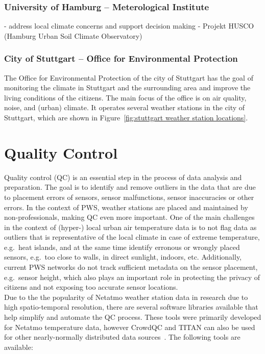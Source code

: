 \subsubsection{University of Hamburg – Meterological Institute}

- address local climate concerns and support decision making
- Projekt HUSCO (Hamburg Urban Soil Climate Observatory)

\subsubsection{City of Stuttgart – Office for Environmental Protection}

The Office for Environmental Protection of the city of Stuttgart has the goal of monitoring the climate in Stuttgart and the surrounding area and improve the living conditions of the citizens. The main focus of the office is on air quality, noise, and (urban) climate. It operates several weather stations in the city of Stuttgart, which are shown in Figure~\ref{fig:stuttgart weather station locations}.


\section{Quality Control}
\label{sec:quality control}

Quality control (QC) is an essential step in the process of data analysis and preparation. The goal is to identify and remove outliers in the data that are due to placement errors of sensors, sensor malfunctions, sensor inaccuracies or other errors. In the context of PWS, weather stations are placed and maintained by non-professionals, making QC even more important. One of the main challenges in the context of (hyper-) local urban air temperature data is to not flag data as outliers that is representative of the local climate in case of extreme temperature, e.g.\ heat islands, and at the same time identify erronous or wrongly placed sensors, e.g.\ too close to walls, in direct sunlight, indoors, etc. Additionally, current PWS networks do not track sufficient metadata on the sensor placement, e.g.\ sensor height, which also plays an important role in protecting the privacy of citizens and not exposing too accurate sensor locations.\\
Due to the the popularity of Netatmo weather station data in research due to high spatio-temporal resolution, there are several software libraries available that help simplify and automate the QC process. These tools were primarily developed for Netatmo temperature data, however CrowdQC and TITAN can also be used for other nearly-normally distributed data sources~\cite{hahn2022observations}. The following tools are available:

